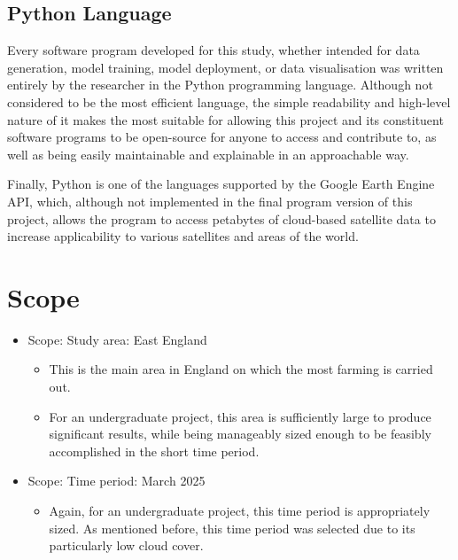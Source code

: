 \subsection{Python Language}
Every software program developed for this study, whether intended for data generation, model training, model deployment, or data visualisation was written entirely by the researcher in the Python programming language. Although not considered to be the most efficient language, the simple readability and high-level nature of it makes the most suitable for allowing this project and its constituent software programs to be open-source for anyone to access and contribute to, as well as being easily maintainable and explainable in an approachable way. 

Finally, Python is one of the languages supported by the Google Earth Engine API, which, although not implemented in the final program version of this project, allows the program to access petabytes of cloud-based satellite data to increase applicability to various satellites and areas of the world. 

\section{Scope}
\begin{itemize}
    \item Scope: Study area: East England
    \begin{itemize}
        \item This is the main area in England on which the most farming is carried out. 
        \item For an undergraduate project, this area is sufficiently large to produce significant results, while being manageably sized enough to be feasibly accomplished in the short time period. 
    \end{itemize}
    \item Scope: Time period: March 2025
    \begin{itemize}
        \item Again, for an undergraduate project, this time period is appropriately sized. As mentioned before, this time period was selected due to its particularly low cloud cover. 
    \end{itemize}
\end{itemize}